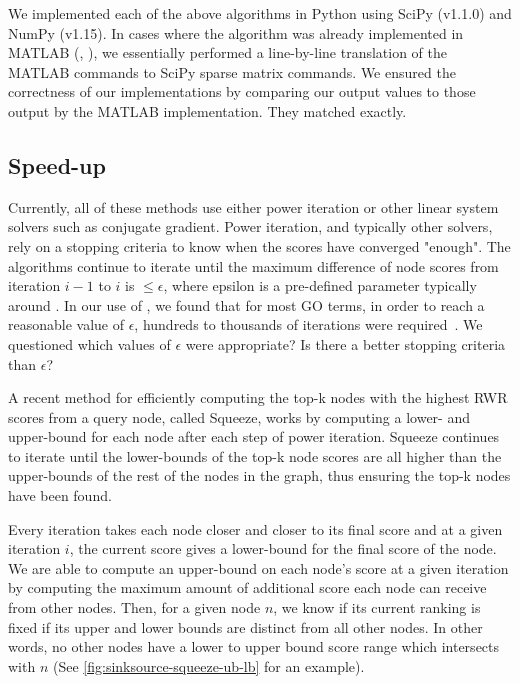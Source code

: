 We implemented each of the above algorithms in Python using SciPy (v1.1.0) and NumPy (v1.15). In cases where the algorithm was already implemented in MATLAB (\genemania, \birgrank), we essentially performed a line-by-line translation of the MATLAB commands to SciPy sparse matrix commands. We ensured the correctness of our implementations by comparing our output values to those output by the MATLAB implementation. They matched exactly. 

\subsection{Speed-up}
\label{sec:speed-up}

Currently, all of these methods use either power iteration or other linear system solvers such as conjugate gradient. 
Power iteration, and typically other solvers, rely on a stopping criteria to know when the scores have converged "enough". 
The algorithms continue to iterate until the maximum difference of node scores from iteration $i-1$ to $i$ is $\leq \epsilon$, where epsilon is a pre-defined parameter typically around  . 
In our use of \sinksource, we found that for most GO terms, in order to reach a reasonable value of $\epsilon$, hundreds to thousands of iterations were required~. 
We questioned which values of $\epsilon$ were appropriate? Is there a better stopping criteria than $\epsilon$?


A recent method for efficiently computing the top-k nodes with the highest RWR scores from a query node, called Squeeze, works by computing a lower- and upper-bound for each node after each step of power iteration. Squeeze continues to iterate until the lower-bounds of the top-k node scores are all higher than the upper-bounds of the rest of the nodes in the graph, thus ensuring the top-k nodes have been found.


Every iteration takes each node closer and closer to its final score and at a given iteration $i$, the current score gives a lower-bound for the final score of the node.
We are able to compute an upper-bound on each node's score at a given iteration by computing the maximum amount of additional score each node can receive from other nodes. 
Then, for a given node $n$, we know if its current ranking is fixed if its upper and lower bounds are distinct from all other nodes. In other words, no other nodes have a lower to upper bound score range which intersects with $n$ (See \fig \ref{fig:sinksource-squeeze-ub-lb} for an example).


